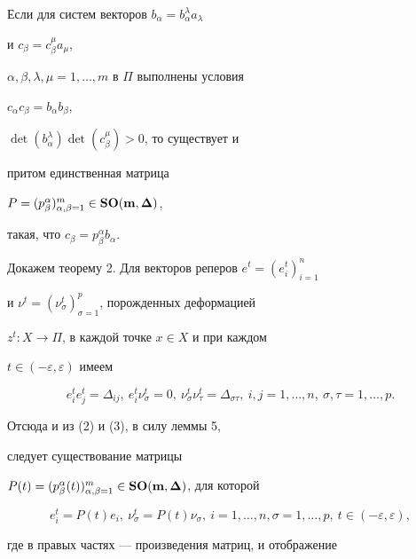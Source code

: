 \begin{lem}


Если для систем векторов $b_{\alpha}= b^{\lambda}_{\alpha}a_{\lambda}$


и $c_{\beta}= c^{\mu}_{\beta}a_{\mu}$,


$\alpha,\beta,\lambda,\mu= 1,\dotsc,m$ в $\Pi$ выполнены условия


$c_{\alpha}c_{\beta}= b_{\alpha}b_{\beta}$,


$\det(b^{\lambda}_{\alpha})\det(c^{\mu}_{\beta})> 0$, то существует и


притом единственная матрица


$P= (p^{\alpha}_{\beta})_{\alpha,\beta=1}^m\in{\bold{SO(m,\boldsymbol\Delta)}}$,


такая, что $c_{\beta}= p^{\alpha}_{\beta}b_{\alpha}$.


\end{lem}





Докажем теорему 2. Для векторов реперов $e^t= (e^t_i)_{i=1}^n$


и $\nu^t= (\nu^t_{\sigma})_{\sigma=1}^p$, порожденных деформацией


$z^t: X\to \Pi$, в каждой точке $x\in X$ и при каждом


$t\in (-\varepsilon,\varepsilon)$ имеем


$$


e^t_ie^t_j=\Delta_{ij},\ e^t_i\nu^t_{\sigma}=0, \ \nu^t_{\sigma}


\nu^t_{\tau}=\Delta_{\sigma\tau}, \ i,j=1,\dotsc,n, \ \sigma,


\tau=1,\dotsc,p.


$$


Отсюда и из (2) и (3), в силу леммы 5,


следует существование матрицы


$P(t)= (p^{\alpha}_{\beta}(t))_{\alpha,\beta=1}^m\in {\bold{


SO(m,\bsy\Delta)}}$, для которой


\begin{equation}


e^t_i=P(t)e_i,\ \nu^t_{\sigma}=P(t)\nu_{\sigma},\ i=1,\dotsc,n, 


\sigma=1,\dotsc,p,\ t\in(-\varepsilon,\varepsilon),


\end{equation}


где в правых частях --- произведения матриц, и отображение


